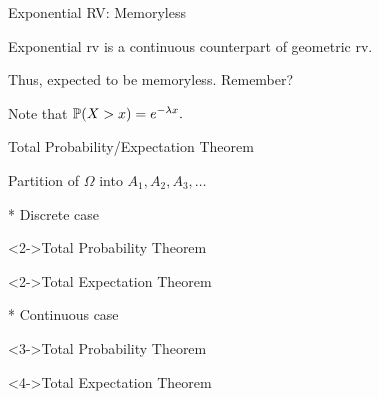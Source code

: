 \begin{frame}{Exponential RV: Memoryless}

\plitemsep 0.1in
\bci 
\item<1-> Exponential rv is a continuous counterpart of geometric rv.
\item<2-> Thus, expected to be memoryless. Remember?


\item<4->  Note that $\mathbb{P}( X > x ) = e^{-\lambda x}.$ 

\eci

\end{frame}

\begin{frame}{Total Probability/Expectation Theorem}

Partition of $\Omega$ into $A_1,A_2,A_3, \ldots$

\medskip

{
\small
* Discrete case
\medskip

\begin{block}<2->{Total Probability Theorem}
 \end{block}

\begin{block}<2->{Total Expectation Theorem}
\end{block}
}
{
\small
* Continuous case
\medskip

\begin{block}<3->{Total Probability Theorem}
 \end{block}

\begin{block}<4->{Total Expectation Theorem}
\end{block}
}

\end{frame}

